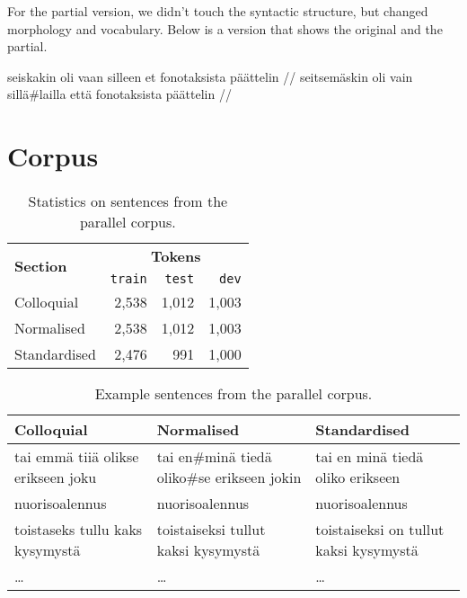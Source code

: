 \documentclass[11pt]{article}
\begin{document}
For the partial version, we didn't touch the syntactic structure, but changed morphology and vocabulary. Below is a version that shows the original and the partial.

\ex
\begingl
\gla seiskakin oli vaan silleen et fonotaksista p\"{a}\"{a}ttelin //
\glb seitsemäskin oli vain sill\"{a}\#lailla ett\"{a} fonotaksista p\"{a}\"{a}ttelin //
\endgl
\xe




\section{Corpus}

\begin{table}
  \centering
 \begin{tabular}{|l|r|r|r|}
    \hline
    \multirow{2}{*}{\textbf{Section}} & \multicolumn{3}{|c|}{\textbf{Tokens}} \\\cline{2-4}
                                      & \texttt{train} & \texttt{test} & \texttt{dev} \\
    \hline
    Colloquial                           & 2,538 & 1,012 & 1,003 \\ 
    Normalised                           & 2,538 & 1,012 & 1,003 \\ 
    Standardised                         & 2,476 & 991 & 1,000 \\
    \hline
 \end{tabular} 
  \caption{Statistics on sentences from the parallel corpus.}
  \label{table:corpsize}
\end{table}

\begin{table*}
  \centering
  \begin{tabular}{|l|l|l|}
  \hline
  \textbf{Colloquial} & \textbf{Normalised} & \textbf{Standardised} \\
  \hline
  tai emm\"{a} tii\"{a} olikse erikseen joku & tai en\#min\"{a} tied\"{a} oliko\#se
  erikseen jokin & tai en min\"{a} tied\"{a} oliko erikseen \\
  nuorisoalennus & nuorisoalennus & nuorisoalennus \\
  \hline
 toistaseks tullu kaks kysymyst\"{a} &toistaiseksi tullut kaksi kysymyst\"{a} & toistaiseksi on tullut kaksi kysymyst\"{a} \\
  \hline
  \ldots & \ldots & \ldots \\
  \hline
  \end{tabular}
  \caption{Example sentences from the parallel corpus.}
  \label{table:corpexample}
\end{table*}
\end{document}
